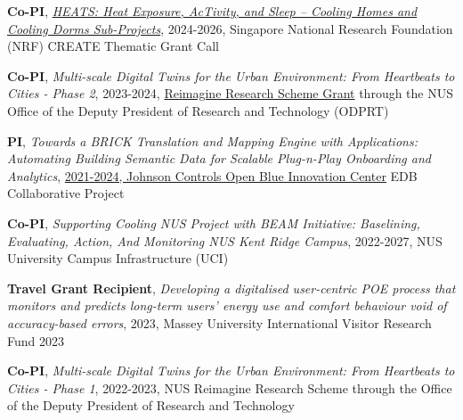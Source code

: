 \documentclass[10pt,a4paper]{article}
\begin{document}
\begin{small}
\begin{etaremune}
  \item \textbf{Co-PI}, \href{https://www.linkedin.com/company/project-heats/}{\emph{HEATS: Heat Exposure, AcTivity, and Sleep -- Cooling Homes and Cooling Dorms Sub-Projects}}, 2024-2026, Singapore National Research Foundation (NRF) CREATE Thematic Grant Call%

  \item \textbf{Co-PI}, \emph{Multi-scale Digital Twins for the Urban Environment: From Heartbeats to Cities - Phase 2}, 2023-2024, \href{https://news.nus.edu.sg/nus-reimagine-research-initiative-to-seed-research-ideas-in-emerging-areas/}{Reimagine Research Scheme Grant} through the NUS Office of the Deputy President of Research and Technology (ODPRT)%

  \item \textbf{PI}, \emph{Towards a BRICK Translation and Mapping Engine with Applications: Automating Building Semantic Data for Scalable Plug-n-Play Onboarding and Analytics}, \href{https://www.johnsoncontrols.com/en_sg/openblue-innovation-center}{2021-2024, Johnson Controls Open Blue Innovation Center} EDB Collaborative Project%

  \item \textbf{Co-PI}, \emph{Supporting Cooling NUS Project with BEAM Initiative: Baselining, Evaluating, Action, And Monitoring NUS Kent Ridge Campus}, 2022-2027, NUS University Campus Infrastructure (UCI)%

  \item \textbf{Travel Grant Recipient}, \emph{Developing a digitalised user-centric POE process that monitors and predicts long-term users' energy use and comfort behaviour void of accuracy-based errors}, 2023, Massey University International Visitor Research Fund 2023%

  \item \textbf{Co-PI}, \emph{Multi-scale Digital Twins for the Urban Environment: From Heartbeats to Cities - Phase 1}, 2022-2023, NUS Reimagine Research Scheme through the Office of the Deputy President of Research and Technology%


\end{etaremune}
\end{small}
\end{document}
